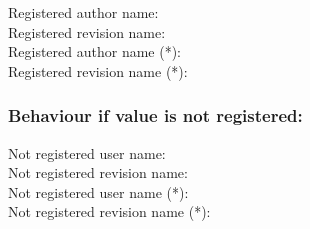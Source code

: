 Registered author name: \rcsFullAuthor{\rcsfileauthor}\\
Registered revision name: \rcsFullRevision{\rcsfilerev}\\
Registered author name (*): \rcsFullAuthor*{\rcsfileauthor}\\
Registered revision name (*): \rcsFullRevision*{\rcsfilerev}\\

\subsubsection*{Behaviour if value is not registered:}
Not registered user name: \\
Not registered revision name: \\
Not registered user name (*): \\
Not registered revision name (*): \\


